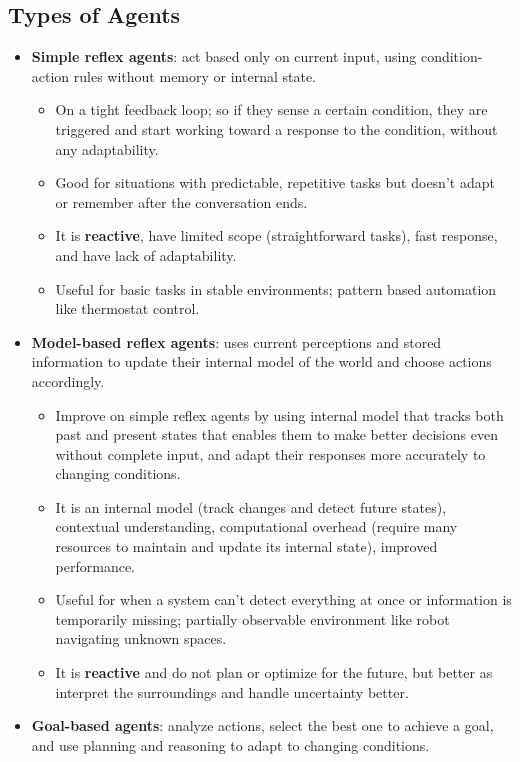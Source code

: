\documentclass[12pt, letterpaper]{article}
\begin{document}
\subsection{Types of Agents}
\begin{itemize}
    \item \textbf{Simple reflex agents}: act based only on current input, using condition-action rules without memory or internal state.
        \begin{itemize}
            \item On a tight feedback loop; so if they sense a certain condition, they are triggered and start working toward a response to the condition, without any adaptability.
            \item Good for situations with predictable, repetitive tasks but doesn't adapt or remember after the conversation ends.
            \item It is \textbf{reactive}, have limited scope (straightforward tasks), fast response, and have lack of adaptability.
            \item Useful for basic tasks in stable environments; pattern based automation like thermostat control.
        \end{itemize}
    \item \textbf{Model-based reflex agents}: uses current perceptions and stored information to update their internal model of the world and choose actions accordingly.
        \begin{itemize}
            \item Improve on simple reflex agents by using internal model that tracks both past and present states that enables them to make better decisions even without complete input, and adapt their responses more accurately to changing conditions.
            \item It is an internal model (track changes and detect future states), contextual understanding, computational overhead (require many resources to maintain and update its internal state), improved performance.
            \item Useful for when a system can't detect everything at once or information is temporarily missing; partially observable environment like robot navigating unknown spaces.
            \item It is \textbf{reactive} and do not plan or optimize for the future, but better as interpret the surroundings and handle uncertainty better.
        \end{itemize}
    \item \textbf{Goal-based agents}: analyze actions, select the best one to achieve a goal, and use planning and reasoning to adapt to changing conditions.

\end{itemize}
\end{document}
